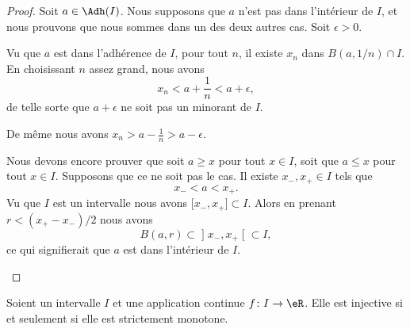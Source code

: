 \begin{proof}
	Soit \( a\in \Adh(I)\). Nous supposons que \( a\) n'est pas dans l'intérieur de \( I\), et nous prouvons que nous sommes dans un des deux autres cas. Soit \( \epsilon>0\).
	\begin{subproof}
		Vu que \( a\) est dans l'adhérence de \( I\), pour tout \( n\), il existe \( x_n\) dans \( B(a,1/n)\cap I\). En choisissant \( n\) assez grand, nous avons
		\begin{equation}
			x_n<a+\frac{1}{ n}<a+\epsilon,
		\end{equation}
		de telle sorte que \( a+\epsilon\) ne soit pas un minorant de \( I\).

		De même nous avons \( x_n>a-\frac{1}{ n}>a-\epsilon\).

		Nous devons encore prouver que soit \( a\geq x\) pour tout \( x\in I\), soit que \( a\leq x\) pour tout \( x\in I\). Supposons que ce ne soit pas le cas. Il existe \( x_-,x_+\in I\) tels que
		\begin{equation}
			x_-<a<x_+.
		\end{equation}
		Vu que \( I\) est un intervalle nous avons \( \mathopen[ x_-,x_+\mathclose]\subset I\). Alors en prenant \( r<(x_+-x_-)/2\) nous avons
		\begin{equation}
			B(a,r)\subset \mathopen] x_-,x_+\mathclose[\subset I,
		\end{equation}
		ce qui signifierait que \( a\) est dans l'intérieur de \( I\).
	\end{subproof}
\end{proof}

\begin{lemma}		\label{LEMooBDGGooSOdOXb}
	Soient un intervalle \( I\) et une application continue \(f \colon I\to \eR  \). Elle est injective si et seulement si elle est strictement monotone.
\end{lemma}

